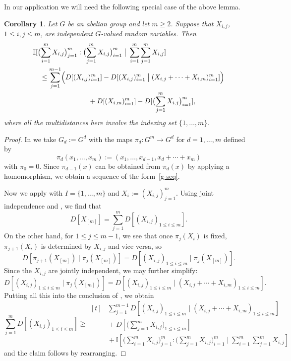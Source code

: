 \documentclass[10pt,a4paper]{article}
\newtheorem{corollary}[theorem]{Corollary}
\newcommand{\lean}[1]{}
\newcommand{\uses}[1]{}
\newcommand{\leanok}{}
\newcommand{\bbI}{\mathbb{I}}
\begin{document}
  In our application we will need the following special case of the above lemma.

  \begin{corollary}\label{cor-multid}\lean{cor_multiDist_chainRule}\leanok Let $G$ be an abelian group and let $m \geq 2$.  Suppose that $X_{i,j}$, $1 \leq i, j \leq m$, are independent $G$-valued random variables.
    Then
    \begin{align*}
      &\bbI[ \bigl(\sum_{i=1}^m X_{i,j}\bigr)_{j =1}^{m} : \bigl(\sum_{j=1}^m X_{i,j}\bigr)_{i = 1}^m \; \big| \; \sum_{i=1}^m \sum_{j = 1}^m  X_{i,j} ] \\
      &\quad \leq \sum_{j=1}^{m-1} \Bigl(D[(X_{i, j})_{i = 1}^m] - D[ (X_{i, j})_{i = 1}^m  \; \big| \; (X_{i,j} + \cdots + X_{i,m})_{i =1}^m ]\Bigr) \\ & \qquad\qquad\qquad\qquad +  D[(X_{i,m})_{i=1}^m] - D[ \bigl(\sum_{j=1}^m X_{i,j}\bigr)_{i=1}^m ],
    \end{align*}
  where all the multidistances here involve the indexing set $\{1,\dots, m\}$.
  \end{corollary}

  \begin{proof}\uses{multidist-chain-rule-iter, add-entropy}\leanok
    In  we take $G_d := G^d$ with the maps $\pi_d \colon G^m \to G^d$ for $d=1,\dots,m$ defined by
  \[
    \pi_d(x_1,\dots,x_m) := (x_1,\dots,x_{d-1}, x_d + \cdots + x_m)
  \]
  with $\pi_0=0$. Since $\pi_{d-1}(x)$ can be obtained from $\pi_{d}(x)$ by applying a homomorphism, we obtain a sequence of the form~\eqref{g-seq}.

  Now we apply  with $I = \{1,\dots, m\}$ and $X_i :=  (X_{i,j})_{j = 1}^m$.  Using joint independence and , we find that
  \[
    D[ X_{[m]} ] = \sum_{j=1}^m D[ (X_{i,j})_{1 \leq i \leq m} ].
  \]
  On the other hand, for $1 \leq j \leq m-1$, we see that once $\pi_{j}(X_i)$ is fixed, $\pi_{j+1}(X_i)$ is determined by $X_{i, j}$ and vice versa, so
  \[
    D[ \pi_{j+1}(X_{[m]}) \; | \; \pi_{j}(X_{[m]}) ] = D[ (X_{i, j})_{1 \leq i \leq m} \; | \; \pi_{j}(X_{[m]} )].
  \]
  Since the $X_{i,j}$ are jointly independent, we may further simplify:
  \[
    D[ (X_{i, j})_{1 \leq i \leq m} \; | \; \pi_{j}(X_{[m]})] = D[ (X_{i,j})_{1 \leq i \leq m} \; | \; ( X_{i, j} + \cdots + X_{i, m})_{1 \leq i \leq m} ].
  \]
  Putting all this into the conclusion of , we obtain
  \[
    \sum_{j=1}^{m} D[ (X_{i,j})_{1 \leq i \leq m} ]
    \geq
    \begin{aligned}[t]
    &\sum_{j=1}^{m-1} D[ (X_{i,j})_{1 \leq i \leq m} \; | \; (X_{i,j} + \cdots + X_{i,m})_{1 \leq i \leq m} ] \\
    &\!\!\!+
    D[ \bigl(\sum_{j=1}^m X_{i,j}\bigr)_{1 \leq i \leq m}] \\
    &\!\!\!+\bbI[  \bigl(\sum_{i=1}^m X_{i,j}\bigr)_{j =1}^{m} : \bigl(\sum_{j=1}^m X_{i,j}\bigr)_{i = 1}^m \; \big| \; \sum_{i=1}^m \sum_{j = 1}^m  X_{i,j} ]
    \end{aligned}
  \]
  and the claim follows by rearranging.
\end{proof}
\end{document}
